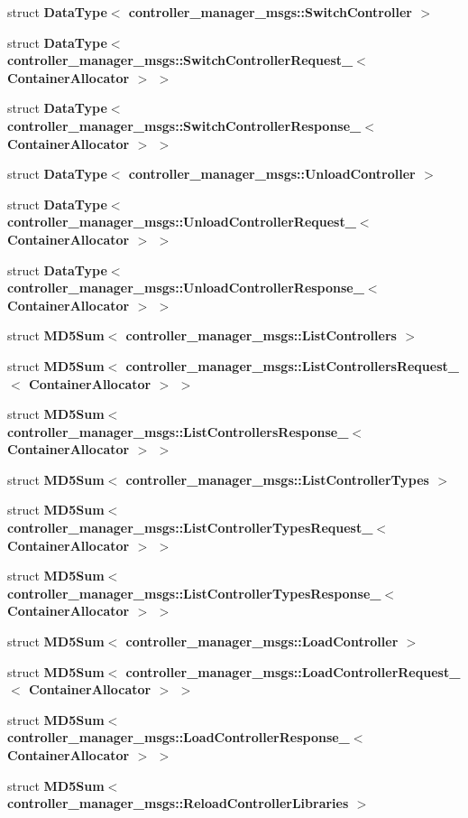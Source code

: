 \begin{DoxyCompactItemize}
\item 
struct {\bf \-Data\-Type$<$ controller\-\_\-manager\-\_\-msgs\-::\-Switch\-Controller $>$}
\item 
struct {\bf \-Data\-Type$<$ controller\-\_\-manager\-\_\-msgs\-::\-Switch\-Controller\-Request\-\_\-$<$ Container\-Allocator $>$ $>$}
\item 
struct {\bf \-Data\-Type$<$ controller\-\_\-manager\-\_\-msgs\-::\-Switch\-Controller\-Response\-\_\-$<$ Container\-Allocator $>$ $>$}
\item 
struct {\bf \-Data\-Type$<$ controller\-\_\-manager\-\_\-msgs\-::\-Unload\-Controller $>$}
\item 
struct {\bf \-Data\-Type$<$ controller\-\_\-manager\-\_\-msgs\-::\-Unload\-Controller\-Request\-\_\-$<$ Container\-Allocator $>$ $>$}
\item 
struct {\bf \-Data\-Type$<$ controller\-\_\-manager\-\_\-msgs\-::\-Unload\-Controller\-Response\-\_\-$<$ Container\-Allocator $>$ $>$}
\item 
struct {\bf \-M\-D5\-Sum$<$ controller\-\_\-manager\-\_\-msgs\-::\-List\-Controllers $>$}
\item 
struct {\bf \-M\-D5\-Sum$<$ controller\-\_\-manager\-\_\-msgs\-::\-List\-Controllers\-Request\-\_\-$<$ Container\-Allocator $>$ $>$}
\item 
struct {\bf \-M\-D5\-Sum$<$ controller\-\_\-manager\-\_\-msgs\-::\-List\-Controllers\-Response\-\_\-$<$ Container\-Allocator $>$ $>$}
\item 
struct {\bf \-M\-D5\-Sum$<$ controller\-\_\-manager\-\_\-msgs\-::\-List\-Controller\-Types $>$}
\item 
struct {\bf \-M\-D5\-Sum$<$ controller\-\_\-manager\-\_\-msgs\-::\-List\-Controller\-Types\-Request\-\_\-$<$ Container\-Allocator $>$ $>$}
\item 
struct {\bf \-M\-D5\-Sum$<$ controller\-\_\-manager\-\_\-msgs\-::\-List\-Controller\-Types\-Response\-\_\-$<$ Container\-Allocator $>$ $>$}
\item 
struct {\bf \-M\-D5\-Sum$<$ controller\-\_\-manager\-\_\-msgs\-::\-Load\-Controller $>$}
\item 
struct {\bf \-M\-D5\-Sum$<$ controller\-\_\-manager\-\_\-msgs\-::\-Load\-Controller\-Request\-\_\-$<$ Container\-Allocator $>$ $>$}
\item 
struct {\bf \-M\-D5\-Sum$<$ controller\-\_\-manager\-\_\-msgs\-::\-Load\-Controller\-Response\-\_\-$<$ Container\-Allocator $>$ $>$}
\item 
struct {\bf \-M\-D5\-Sum$<$ controller\-\_\-manager\-\_\-msgs\-::\-Reload\-Controller\-Libraries $>$}

\end{DoxyCompactItemize}
